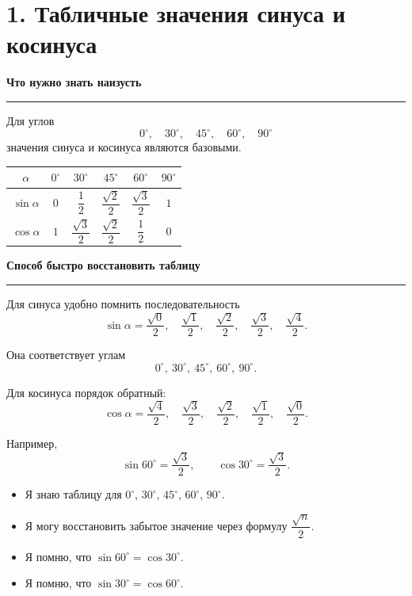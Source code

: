 \documentclass[a4paper,12pt]{article}
\newcommand{\checkitem}{\item[$\square$]}
\newcommand{\accentline}{%
    \vspace{0.2em}
    {\color{accent}\rule{\linewidth}{0.6pt}}
    \vspace{0.5em}
}
\newcommand{\topic}[1]{%
    \vspace{0.5em}
    {\large\bfseries\color{darkaccent}#1}\par
    \accentline
}
\begin{document}

\section*{\color{darkaccent}1. Табличные значения синуса и косинуса}

\topic{Что нужно знать наизусть}

Для углов
\[
0^\circ,\quad 30^\circ,\quad 45^\circ,\quad 60^\circ,\quad 90^\circ
\]
значения синуса и косинуса являются базовыми.

\begin{center}
\renewcommand{\arraystretch}{1.4}
\begin{tabular}{c c c c c c}
\toprule
$\alpha$ &
$0^\circ$ &
$30^\circ$ &
$45^\circ$ &
$60^\circ$ &
$90^\circ$
\\
\midrule
$\sin\alpha$ &
$0$ &
$\dfrac12$ &
$\dfrac{\sqrt2}{2}$ &
$\dfrac{\sqrt3}{2}$ &
$1$
\\[0.25cm]
$\cos\alpha$ &
$1$ &
$\dfrac{\sqrt3}{2}$ &
$\dfrac{\sqrt2}{2}$ &
$\dfrac12$ &
$0$
\\
\bottomrule
\end{tabular}
\end{center}

\topic{Способ быстро восстановить таблицу}

Для синуса удобно помнить последовательность
\[
\sin\alpha=
\frac{\sqrt{0}}2,\quad
\frac{\sqrt{1}}2,\quad
\frac{\sqrt{2}}2,\quad
\frac{\sqrt{3}}2,\quad
\frac{\sqrt{4}}2.
\]

Она соответствует углам
\[
0^\circ,\ 30^\circ,\ 45^\circ,\ 60^\circ,\ 90^\circ.
\]

Для косинуса порядок обратный:
\[
\cos\alpha=
\frac{\sqrt{4}}2,\quad
\frac{\sqrt{3}}2,\quad
\frac{\sqrt{2}}2,\quad
\frac{\sqrt{1}}2,\quad
\frac{\sqrt{0}}2.
\]

Например,
\[
\sin60^\circ=\frac{\sqrt3}{2},
\qquad
\cos30^\circ=\frac{\sqrt3}{2}.
\]

\begin{itemize}
\checkitem Я знаю таблицу для $0^\circ$, $30^\circ$, $45^\circ$, $60^\circ$, $90^\circ$.
\checkitem Я могу восстановить забытое значение через формулу $\dfrac{\sqrt n}{2}$.
\checkitem Я помню, что $\sin60^\circ=\cos30^\circ$.
\checkitem Я помню, что $\sin30^\circ=\cos60^\circ$.
\end{itemize}

\end{document}
